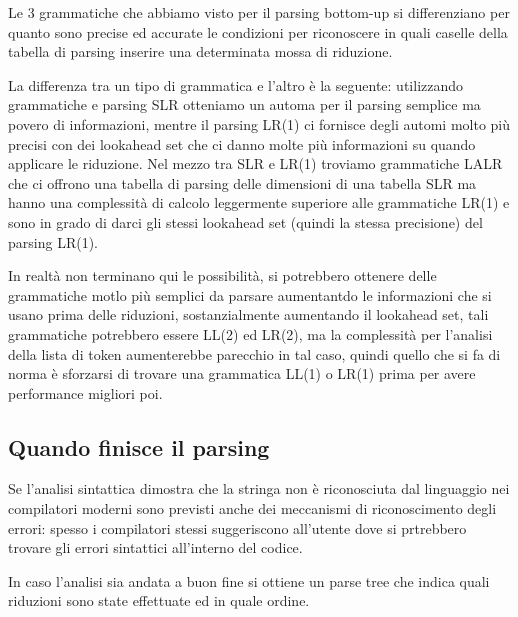 \documentclass[class=book, crop=false, oneside, 12pt]{standalone}
\begin{document}
Le 3 grammatiche che abbiamo visto per il parsing bottom-up si differenziano per quanto sono precise ed accurate le condizioni per riconoscere in quali caselle della tabella di parsing inserire una determinata mossa di riduzione.

La differenza tra un tipo di grammatica e l'altro è la seguente: utilizzando grammatiche e parsing SLR otteniamo un automa per il parsing semplice ma povero di informazioni, mentre il parsing LR(1) ci fornisce degli automi molto più precisi con dei lookahead set che ci danno molte più informazioni su quando applicare le riduzione.
Nel mezzo tra SLR e LR(1) troviamo grammatiche LALR che ci offrono una tabella di parsing delle dimensioni di una tabella SLR ma hanno una complessità di calcolo leggermente superiore alle grammatiche LR(1) e sono in grado di darci gli stessi lookahead set (quindi la stessa precisione) del parsing LR(1).

In realtà non terminano qui le possibilità, si potrebbero ottenere delle grammatiche motlo più semplici da parsare aumentantdo le informazioni che si usano prima delle riduzioni, sostanzialmente aumentando il lookahead set, tali grammatiche potrebbero essere LL(2) ed LR(2), ma la complessità per l'analisi della lista di token aumenterebbe parecchio in tal caso, quindi quello che si fa di norma è sforzarsi di trovare una grammatica LL(1) o LR(1) prima per avere performance migliori poi.

\subsection{Quando finisce il parsing}
Se l'analisi sintattica dimostra che la stringa non è riconosciuta dal linguaggio nei compilatori moderni sono previsti anche dei meccanismi di riconoscimento degli errori: spesso i compilatori stessi suggeriscono all'utente dove si prtrebbero trovare gli errori sintattici all'interno del codice.

In caso l'analisi sia andata a buon fine si ottiene un parse tree che indica quali riduzioni sono state effettuate ed in quale ordine.
\end{document}
